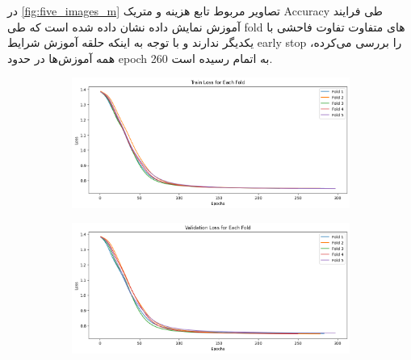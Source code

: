 \documentclass{article}
\begin{document}
در 
\autoref{fig:five_images_m}
 تصاویر مربوط تابع هزینه و متریک‌ 
Accuracy 
طی فرایند آموزش نمایش داده نشان داده شده است که طی fold های متفاوت تفاوت فاحشی با یکدیگر ندارند و با توجه به اینکه حلقه آموزش شرایط
early stop
را بررسی می‌کرده، همه آموزش‌ها در حدود 
epoch
260 
به اتمام رسیده است.


\begin{figure}[H]
    \centering
    \begin{subfigure}[b]{0.45\textwidth}
        \centering
        \includegraphics[width=\textwidth]{img/Q2/trainlf.png}
        \label{fig:image1}
    \end{subfigure}
    \hfill
    \begin{subfigure}[b]{0.45\textwidth}
        \centering
        \includegraphics[width=\textwidth]{img/Q2/vallf.png}
        \label{fig:image3}
    \end{subfigure}
    
    \vspace{0.5cm}
    

\end{figure}
\end{document}
